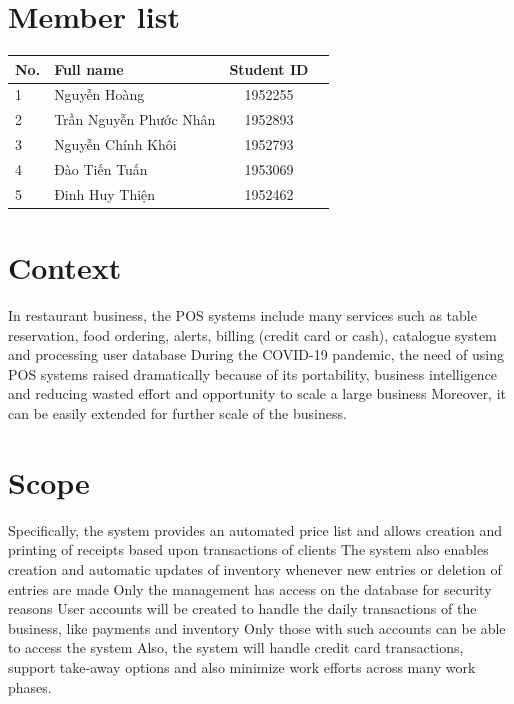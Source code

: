 \documentclass[a4paper]{article}
\numberwithin{equation}{section}
\begin{document}
\section*{Member list}
\begin{center}
  \begin{tabular}{llcc}
    \toprule
    \textbf{No.} & \textbf{Full name}     & \textbf{Student ID} \\
    \midrule
    1            & Nguyễn Hoàng           & 1952255             \\
    2            & Trần Nguyễn Phước Nhân & 1952893             \\
    3            & Nguyễn Chính Khôi      & 1952793             \\
    4            & Đào Tiến Tuấn          & 1953069             \\
    5            & Đinh Huy Thiện         & 1952462
    \\
    \bottomrule
  \end{tabular}
\end{center}

\newpage
\tableofcontents
\newpage

\section{Context}
In restaurant business, the POS systems include many services such as table reservation, food ordering, alerts, billing (credit card or cash), catalogue system and processing user database
During the COVID-19 pandemic, the need of using POS systems raised dramatically because of its portability, business intelligence and reducing wasted effort and opportunity to scale a large business
Moreover, it can be easily extended for further scale of the business.

\section{Scope}
Specifically, the system provides an automated price list and allows creation and printing of receipts based upon transactions of clients
The system also enables creation and automatic updates of inventory whenever new entries or deletion of entries are made
Only the management has access on the database for security reasons
User accounts will be created to handle the daily transactions of the business, like payments and inventory
Only those with such accounts can be able to access the system
Also, the system will handle credit card transactions, support take-away options and also minimize work efforts across many work phases.
\end{document}
